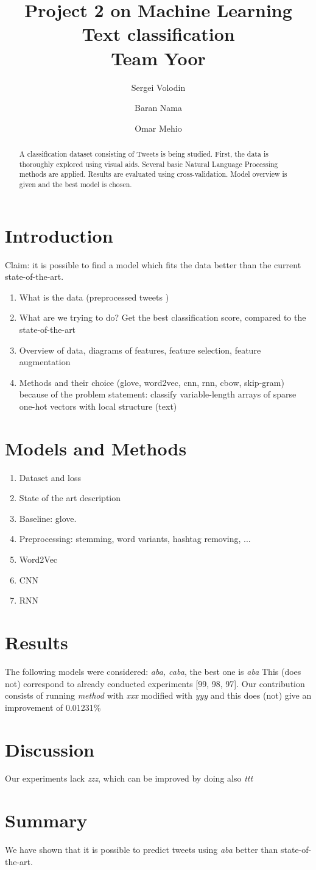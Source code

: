 \documentclass[10pt,conference,compsocconf]{IEEEtran}
\title{Project 2 on Machine Learning\\Text classification\\Team Yoor}
\author[1]{Sergei Volodin}
\author[1]{Baran Nama}
\author[1]{Omar Mehio}
\affil[1]{EPFL}
\affil[ ]{\textit {\{sergei.volodin,baran.nama,omar.mehio\}@epfl.ch}}
\begin{document}
\maketitle

\begin{abstract}
A classification dataset consisting of Tweets is being studied. First, the data is thoroughly explored using visual aids. Several basic Natural Language Processing methods are applied. Results are evaluated using cross-validation. Model overview is given and the best model is chosen.
\end{abstract}

\section{Introduction}
Claim: it is possible to find a model which fits the data better than the current state-of-the-art.
\begin{enumerate}
	\item What is the data (preprocessed tweets \cite{data})
	\item What are we trying to do? Get the best classification score, compared to the state-of-the-art \cite{sota}
	\item Overview of data, diagrams of features, feature selection, feature augmentation
	\item Methods and their choice (glove, word2vec, cnn, rnn, cbow, skip-gram) because of the problem statement: classify variable-length arrays of sparse one-hot vectors with local structure (text)
\end{enumerate}
\section{Models and Methods}
\begin{enumerate}
\item Dataset and loss
\item State of the art description
\item Baseline: glove.
\item Preprocessing: stemming, word variants, hashtag removing, ...
\item Word2Vec
\item CNN
\item RNN
\end{enumerate}
\section{Results}
The following models were considered: {\em aba, caba}, the best one is {\em aba} This (does not) correspond to already conducted experiments [99, 98, 97]. Our contribution consists of running {\em method} with {\em xxx} modified with {\em yyy} and this does (not) give an improvement of 0.01231\%
\section{Discussion}
Our experiments lack {\em zzz}, which can be improved by doing also {\em ttt}
\section{Summary}
We have shown that it is possible to predict tweets using {\em aba} better than state-of-the-art.
\end{document}
